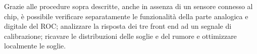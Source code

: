 \begin{description}
\end{description}

Grazie alle procedure sopra descritte, anche in assenza di un sensore connesso al chip, \`e possibile verificare separatamente le funzionalità della parte analogica e digitale del ROC; analizzare la risposta dei tre front end ad un segnale di calibrazione; ricavare le distribuzioni delle soglie e del rumore e ottimizzare localmente le soglie.





